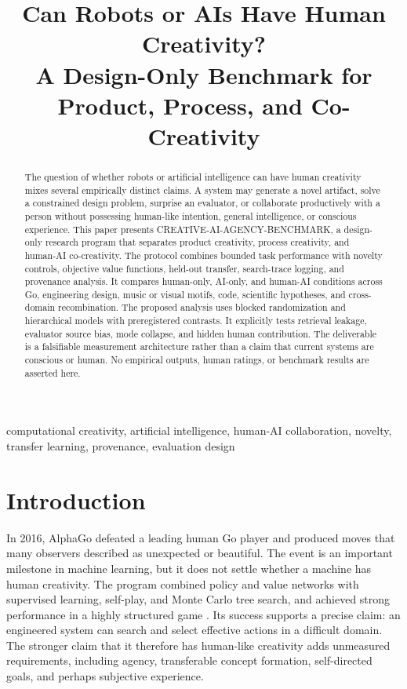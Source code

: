 \documentclass[conference]{IEEEtran}
\title{Can Robots or AIs Have Human Creativity?\\
A Design-Only Benchmark for Product, Process, and Co-Creativity}
\author{\IEEEauthorblockN{Four-Agent Research Workflow}
\IEEEauthorblockA{Survey -- Idea -- ExperimentDesign -- Author\\
Design-only research report}}
\begin{document}
\maketitle

\begin{abstract}
The question of whether robots or artificial intelligence can have human creativity
mixes several empirically distinct claims. A system may generate a novel artifact, solve
a constrained design problem, surprise an evaluator, or collaborate productively with a
person without possessing human-like intention, general intelligence, or conscious
experience. This paper presents CREATIVE-AI-AGENCY-BENCHMARK, a design-only research
program that separates product creativity, process creativity, and human-AI
co-creativity. The protocol combines bounded task performance with novelty controls,
objective value functions, held-out transfer, search-trace logging, and provenance
analysis. It compares human-only, AI-only, and human-AI conditions across Go, engineering
design, music or visual motifs, code, scientific hypotheses, and cross-domain
recombination. The proposed analysis uses blocked randomization and hierarchical models
with preregistered contrasts. It explicitly tests retrieval leakage, evaluator source
bias, mode collapse, and hidden human contribution. The deliverable is a falsifiable
measurement architecture rather than a claim that current systems are conscious or
human. No empirical outputs, human ratings, or benchmark results are asserted here.
\end{abstract}

\begin{IEEEkeywords}
computational creativity, artificial intelligence, human-AI collaboration, novelty,
transfer learning, provenance, evaluation design
\end{IEEEkeywords}

\section{Introduction}
\label{sec:introduction}

In 2016, AlphaGo defeated a leading human Go player and produced moves that many
observers described as unexpected or beautiful. The event is an important milestone in
machine learning, but it does not settle whether a machine has human creativity. The
program combined policy and value networks with supervised learning, self-play, and
Monte Carlo tree search, and achieved strong performance in a highly structured game
\cite{silver2016}. Its success supports a precise claim: an engineered system can search
and select effective actions in a difficult domain. The stronger claim that it therefore
has human-like creativity adds unmeasured requirements, including agency, transferable
concept formation, self-directed goals, and perhaps subjective experience.
\end{document}

